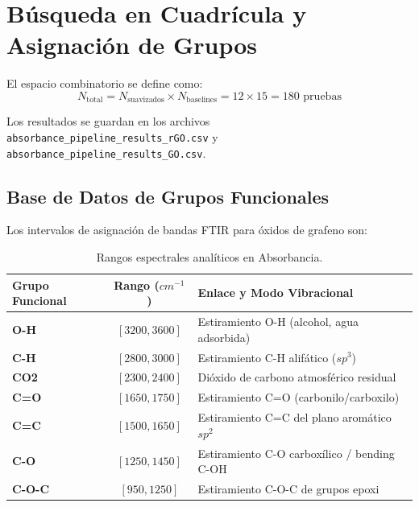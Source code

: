 \documentclass[a4paper,11pt]{article}
\begin{document}
\newpage

\section{Búsqueda en Cuadrícula y Asignación de Grupos}
El espacio combinatorio se define como:
\begin{equation}
    N_{\text{total}} = N_{\text{suavizados}} \times N_{\text{baselines}} = 12 \times 15 = 180 \text{ pruebas}
\end{equation}

Los resultados se guardan en los archivos \texttt{absorbance\_pipeline\_results\_rGO.csv} y \texttt{absorbance\_pipeline\_results\_GO.csv}.

\subsection{Base de Datos de Grupos Funcionales}
Los intervalos de asignación de bandas FTIR para óxidos de grafeno son:
\begin{table}[h]
    \centering
    \caption{Rangos espectrales analíticos en Absorbancia.}
    \begin{tabular}{lcl}
        \toprule
        Grupo Funcional & Rango ($cm^{-1}$) & Enlace y Modo Vibracional \\
        \midrule
        \textbf{O-H}   & $[3200, 3600]$ & Estiramiento O-H (alcohol, agua adsorbida) \\
        \textbf{C-H}   & $[2800, 3000]$ & Estiramiento C-H alifático ($sp^3$) \\
        \textbf{CO2}   & $[2300, 2400]$ & Dióxido de carbono atmosférico residual \\
        \textbf{C=O}   & $[1650, 1750]$ & Estiramiento C=O (carbonilo/carboxilo) \\
        \textbf{C=C}   & $[1500, 1650]$ & Estiramiento C=C del plano aromático $sp^2$ \\
        \textbf{C-O}   & $[1250, 1450]$ & Estiramiento C-O carboxílico / bending C-OH \\
        \textbf{C-O-C} & $[950, 1250]$  & Estiramiento C-O-C de grupos epoxi \\
        \bottomrule
    \end{tabular}
\end{table}

\end{document}
